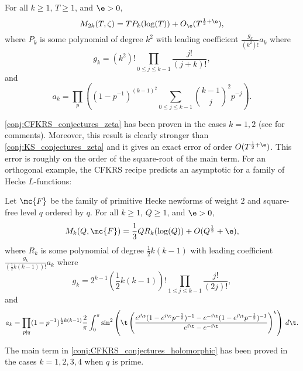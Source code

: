   \begin{conjecture}\label{conj:CFKRS_conjectures_zeta}
    For all $k \ge 1$, $T \ge 1$, and $\e > 0$,
    \[
      M_{2k}(T,\zeta) = TP_{k}(\log(T))+O_{\e}(T^{\frac{1}{2}+\e}),
    \]
    where $P_{k}$ is some polynomial of degree $k^{2}$ with leading coefficient $\frac{g_{k}}{(k^{2})!}a_{k}$ where
    \[
      g_{k} = (k^{2})!\prod_{0 \le j \le k-1}\frac{j!}{(j+k)!},
    \]
    and
    \[
      a_{k} = \prod_{p}\left((1-p^{-1})^{(k-1)^{2}}\sum_{0 \le j \le k-1}\binom{k-1}{j}^{2}p^{-j}\right).
    \]
  \end{conjecture}

  \cref{conj:CFKRS_conjectures_zeta} has been proven in the cases $k = 1,2$ (see \cite{conrey2005integral} for comments). Moreover, this result is clearly stronger than \cref{conj:KS_conjectures_zeta} and it gives an exact error of order $O(T^{\frac{1}{2}+\e})$. This error is roughly on the order of the square-root of the main term. For an orthogonal example, the CFKRS recipe predicts an asymptotic for a family of Hecke $L$-functions:

  \begin{conjecture}\label{conj:CFKRS_conjectures_holomorphic}
    Let $\mc{F}$ be the family of primitive Hecke newforms of weight $2$ and square-free level $q$ ordered by $q$. For all $k \ge 1$, $Q \ge 1$, and $\e > 0$,
    \[
      M_{k}(Q,\mc{F}) = \frac{1}{3}QR_{k}(\log(Q))+O(Q^{\frac{1}{2}}+\e),
    \]
    where $R_{k}$ is some polynomial of degree $\frac{1}{2}k(k-1)$ with leading coefficient $\frac{g_{k}}{\left(\frac{1}{2}k(k-1)\right)!}a_{k}$ where
    \[
      g_{k} = 2^{k-1}\left(\frac{1}{2}k(k-1)\right)!\prod_{1 \le j \le k-1}\frac{j!}{(2j)!},
    \]
    and
    \[
      a_{k} = \prod_{p \nmid q}(1-p^{-1})^{\frac{1}{2}k(k-1)}\frac{2}{\pi}\int_{0}^{\pi}\sin^{2}\left(\t\left(\frac{e^{i\t}(1-e^{i\t}p^{-\frac{1}{2}})^{-1}-e^{-i\t}(1-e^{i\t}p^{-\frac{1}{2}})^{-1}}{e^{i\t}-e^{-i\t}}\right)^{k}\right)\,d\t.
    \]
  \end{conjecture}

  The main term in \cref{conj:CFKRS_conjectures_holomorphic} has been proved in the cases $k = 1,2,3,4$ when $q$ is prime.